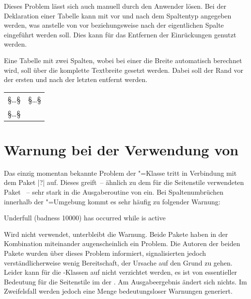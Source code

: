 Dieses Problem lässt sich auch manuell durch den Anwender lösen. Bei der 
Deklaration einer Tabelle kann mit \PParameter{\dots} vor und 
nach dem Spaltentyp angegeben werden, was anstelle von  vor 
beziehungsweise nach der eigentlichen Spalte eingeführt werden soll. Dies kann 
für das Entfernen der Einrückungen genutzt werden.
%
\begin{Example}
Eine Tabelle mit zwei Spalten, wobei bei einer die Breite automatisch berechnet 
wird, soll über die komplette Textbreite gesetzt werden. Dabei soll der Rand 
vor der ersten und nach der letzten entfernt werden.
\begin{Code}[escapechar=§]
\begin{tabularx}{\textwidth}{@{}lX@{}}
§\dots§ & §\dots§ \tabularnewline
§\dots§
\end{tabularx}
\end{Code}
\end{Example}



\section{Warnung bei der Verwendung von }
%
Das einzig momentan bekannte Problem der \TUDScript"=Klasse tritt in Verbindung 
mit dem Paket |?| auf. Dieses greift~-- ähnlich zu dem für 
die Seitenstile verwendeten Paket ~-- sehr stark in 
die Ausgaberoutine von  ein. Bei Spaltenumbrüchen innerhalb der 
"=Umgebung kommt es sehr häufig zu folgender Warnung:
%
\begin{quoting}
\begin{Code}
Underfull \hbox (badness 10000) has occurred while \output is active
\end{Code}
\end{quoting}
%
Wird  nicht verwendet, unterbleibt die Warnung. Beide 
Pakete haben in der Kombination miteinander augenscheinlich ein Problem. Die 
Autoren der beiden Pakete wurden über dieses Problem informiert, signalisierten 
jedoch verständlicherweise wenig Bereitschaft, der Ursache auf den Grund zu 
gehen. Leider kann für die \TUDScript-Klassen auf  
nicht verzichtet werden, es ist von essentieller Bedeutung für die Seitenstile 
im \CD der \TnUD. Am Ausgabeergebnis ändert sich nichts. Im Zweifelsfall werden 
jedoch eine Menge bedeutungsloser Warnungen generiert. 

